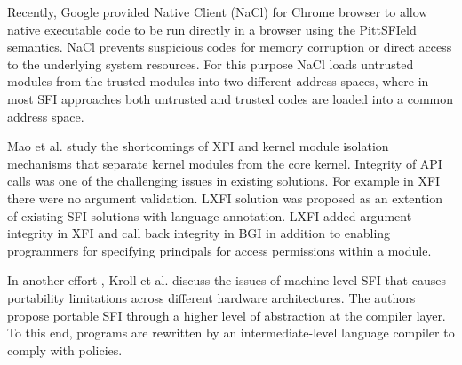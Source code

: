 Recently, Google provided Native Client (NaCl) \cite{NaCl-09} for Chrome browser to allow native executable code to be run directly in a browser using the PittSFIeld semantics. NaCl prevents suspicious codes for memory corruption or direct access to the underlying system resources. For this purpose NaCl loads untrusted modules from the trusted modules into two different address spaces, where in most SFI approaches both untrusted and trusted codes are loaded into a common address space. 

Mao et al. \cite{LXFI} study the shortcomings of XFI \cite{XFI} and \cite{BGI} kernel module isolation mechanisms that separate kernel modules from the core kernel. Integrity of API calls was one of the challenging issues in existing solutions. For example in XFI there were no argument validation. LXFI solution was proposed as an extention of existing SFI solutions with language annotation. LXFI added argument integrity in XFI and call back integrity in BGI in addition to enabling programmers for specifying principals for access permissions within a module.

In another effort \cite{PSFI}, Kroll et al. discuss the issues of machine-level SFI that causes portability limitations across different hardware architectures. The authors propose portable SFI through a higher level of abstraction at the compiler layer. To this end, programs are rewritten by an intermediate-level language compiler to comply with policies.



